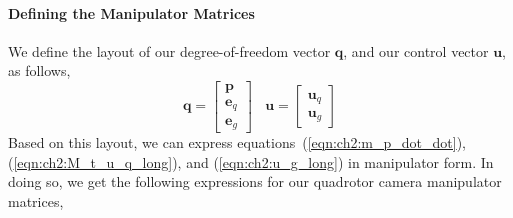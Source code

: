 \paragraph{Defining the Manipulator Matrices}
We define the layout of our degree-of-freedom vector $\mathbf{q}$, and our control vector $\mathbf{u}$, as follows,
%
\begin{equation}
\mathbf{q} = 
\begin{bmatrix}
\mathbf{p} \\
\mathbf{e}_q \\
\mathbf{e}_g
\end{bmatrix}
%
~~~~
\mathbf{u} = 
\begin{bmatrix}
\mathbf{u}_q \\
\mathbf{u}_g
\end{bmatrix}
\end{equation}
%
Based on this layout, we can express equations~(\ref{eqn:ch2:m_p_dot_dot}), (\ref{eqn:ch2:M_t_u_q_long}), and (\ref{eqn:ch2:u_g_long}) in manipulator form.
In doing so, we get the following expressions for our quadrotor camera manipulator matrices,
%
